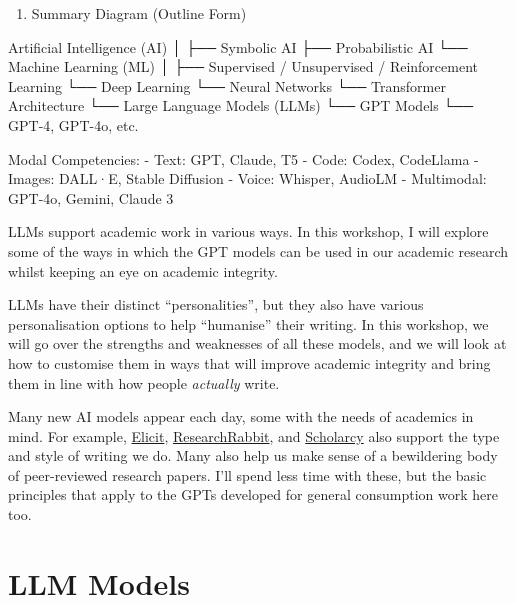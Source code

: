 \documentclass[
  10t,
]{article}
\newenvironment{Shaded}{\begin{snugshade}}{\end{snugshade}}
\newcommand{\NormalTok}[1]{#1}
\providecommand{\tightlist}{%
  \setlength{\itemsep}{0pt}\setlength{\parskip}{0pt}}
\begin{document}
\begin{enumerate}
\def\labelenumi{\Roman{enumi}.}
\setcounter{enumi}{6}
\tightlist
\item
  Summary Diagram (Outline Form)
\end{enumerate}

\begin{Shaded}
\begin{Highlighting}[]
\NormalTok{Artificial Intelligence (AI)}
\NormalTok{│}
\NormalTok{├── Symbolic AI}
\NormalTok{├── Probabilistic AI}
\NormalTok{└── Machine Learning (ML)}
\NormalTok{    │}
\NormalTok{    ├── Supervised / Unsupervised / Reinforcement Learning}
\NormalTok{    └── Deep Learning}
\NormalTok{        └── Neural Networks}
\NormalTok{            └── Transformer Architecture}
\NormalTok{                └── Large Language Models (LLMs)}
\NormalTok{                    └── GPT Models}
\NormalTok{                        └── GPT{-}4, GPT{-}4o, etc.}

\NormalTok{Modal Competencies:}
\NormalTok{{-} Text: GPT, Claude, T5}
\NormalTok{{-} Code: Codex, CodeLlama}
\NormalTok{{-} Images: DALL·E, Stable Diffusion}
\NormalTok{{-} Voice: Whisper, AudioLM}
\NormalTok{{-} Multimodal: GPT{-}4o, Gemini, Claude 3}
\end{Highlighting}
\end{Shaded}

LLMs support academic work in various ways. In this workshop, I will
explore some of the ways in which the GPT models can be used in our
academic research whilst keeping an eye on academic integrity.

LLMs have their distinct ``personalities'', but they also have various
personalisation options to help ``humanise'' their writing. In this
workshop, we will go over the strengths and weaknesses of all these
models, and we will look at how to customise them in ways that will
improve academic integrity and bring them in line with how people
\emph{actually} write.

Many new AI models appear each day, some with the needs of academics in
mind. For example, \href{https://elicit.com/}{Elicit},
\href{https://www.researchrabbit.ai/}{ResearchRabbit}, and
\href{https://www.scholarcy.com/}{Scholarcy} also support the type and
style of writing we do. Many also help us make sense of a bewildering
body of peer-reviewed research papers. I'll spend less time with these,
but the basic principles that apply to the GPTs developed for general
consumption work here too.

\section{LLM Models}\label{llm-models}
\end{document}
